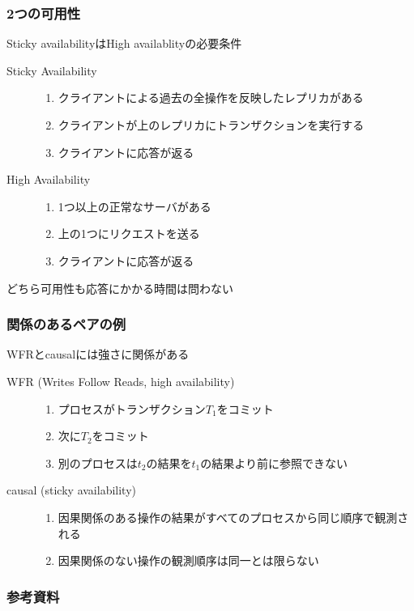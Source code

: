 \documentclass[unicode, 14pt, aspectratio=169]{beamer}
\begin{document}
\begin{frame}
  \frametitle{2つの可用性}
  {\large Sticky availabilityはHigh availablityの必要条件}
  \begin{description}
  \item[Sticky Availability]
    \begin{enumerate}[before=\leavevmode]
    \item クライアントによる過去の全操作を反映したレプリカがある
    \item クライアントが上のレプリカにトランザクションを実行する
    \item クライアントに応答が返る
    \end{enumerate}
  \item[High Availability]
    \begin{enumerate}[before=\leavevmode]
    \item 1つ以上の正常なサーバがある
    \item 上の1つにリクエストを送る
    \item クライアントに応答が返る
    \end{enumerate}
  \end{description}
  どちら可用性も応答にかかる時間は問わない
\end{frame}
\begin{frame}
  \frametitle{関係のあるペアの例}
  {\large WFRとcausalには強さに関係がある}
  \begin{description}
  \item[WFR (Writes Follow Reads, high availability)]
    \begin{enumerate}[before=\leavevmode]
    \item プロセスがトランザクション$T_1$をコミット
     \item 次に$T_2$をコミット
    \item 別のプロセスは$t_2$の結果を$t_1$の結果より前に参照できない
    \end{enumerate}
  \item[causal (sticky availability)]
    \begin{enumerate}[before=\leavevmode]
    \item 因果関係のある操作の結果がすべてのプロセスから同じ順序で観測される
    \item 因果関係のない操作の観測順序は同一とは限らない
      \end{enumerate}
  \end{description}
\end{frame}
\begin{frame}[allowframebreaks,t]
  \frametitle{参考資料}
  \printbibliography
  \nocite{*}
\end{frame}
\end{document}
